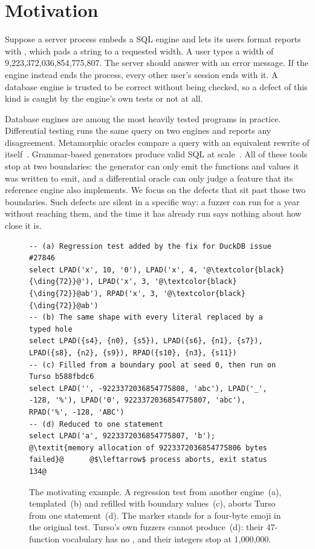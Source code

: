 \section{Motivation}
\label{sec:motivation}
\label{sec:intro}

Suppose a server process embeds a SQL engine and lets its users format reports
with , which pads a string to a requested width. A user types a width
of 9{,}223{,}372{,}036{,}854{,}775{,}807. The server should answer with an error
message. If the engine instead ends the process, every other user's session ends
with it. A database engine is trusted to be correct without being checked, so a
defect of this kind is caught by the engine's own tests or not at all.

Database engines are among the most heavily tested programs in practice.
Differential testing runs the same query on two engines and reports any
disagreement. Metamorphic oracles compare a query with an equivalent rewrite of
itself~\cite{rigger2020tlp,rigger2020norec}. Grammar-based generators produce
valid SQL at scale~\cite{zhong2020squirrel,liang2026sqlbull}. All of these tools
stop at two boundaries: the generator can only emit the functions and values it
was written to emit, and a differential oracle can only judge a feature that its
reference engine also implements. We focus on the defects that sit past those
two boundaries. Such defects are silent in a specific way: a fuzzer can run for
a year without reaching them, and the time it has already run says nothing about
how close it is.

\begin{figure}[t]
\begin{lstlisting}[escapechar=@]
-- (a) Regression test added by the fix for DuckDB issue #27846
select LPAD('x', 10, '0'), LPAD('x', 4, '@\textcolor{black}{\ding{72}}@'), LPAD('x', 3, '@\textcolor{black}{\ding{72}}@ab'), RPAD('x', 3, '@\textcolor{black}{\ding{72}}@ab')
-- (b) The same shape with every literal replaced by a typed hole
select LPAD({s4}, {n0}, {s5}), LPAD({s6}, {n1}, {s7}), LPAD({s8}, {n2}, {s9}), RPAD({s10}, {n3}, {s11})
-- (c) Filled from a boundary pool at seed 0, then run on Turso b588fbdc6
select LPAD('', -9223372036854775808, 'abc'), LPAD('_', -128, '%'), LPAD('0', 9223372036854775807, 'abc'), RPAD('%', -128, 'ABC')
-- (d) Reduced to one statement
select LPAD('a', 9223372036854775807, 'b');
@\textit{memory allocation of 9223372036854775806 bytes failed}@      @$\leftarrow$ process aborts, exit status 134@
\end{lstlisting}
\caption{The motivating example. A regression test from another engine~(a),
templated~(b) and refilled with boundary values~(c), aborts Turso from one
statement~(d). The marker  stands for a four-byte emoji in the original
test. Turso's own fuzzers cannot produce~(d): their 47-function vocabulary has
no , and their integers stop at 1{,}000{,}000.}
\label{fig:motivating}
\end{figure}

